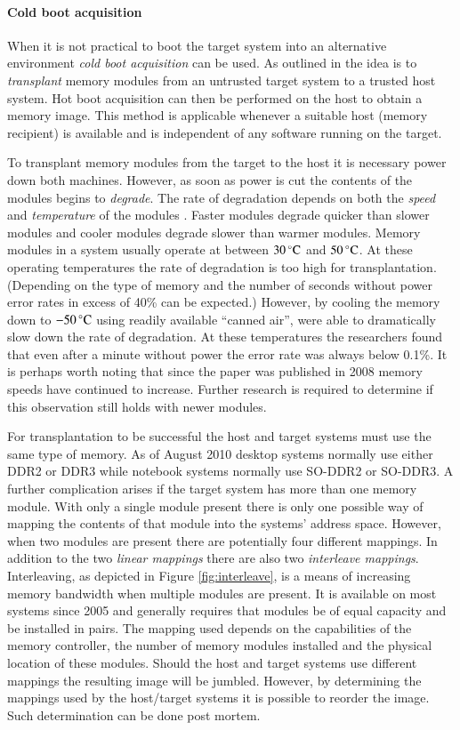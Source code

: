 \documentclass[numbers=noenddot,      %
               abstract,              %
               captions=tableheading, %
               DIV=8]                 %
              {scrartcl}
\begin{document}
\paragraph{Cold boot acquisition}
When it is not practical to boot the target system into an alternative
environment \emph{cold boot acquisition} can be used. As outlined in
\cite{halderman08} the idea is to \emph{transplant} memory modules from
an untrusted target system to a trusted host system. Hot boot
acquisition can then be performed on the host to obtain a memory
image. This method is applicable whenever a suitable host (memory
recipient) is available and is independent of any software running on
the target.

To transplant memory modules from the target to the host it is necessary
power down both machines. However, as soon as power is cut the contents
of the modules begins to \emph{degrade}. The rate of degradation depends
on both the \emph{speed} and \emph{temperature} of the modules
\citep[][table 2]{halderman08}. Faster modules degrade quicker than
slower modules and cooler modules degrade slower than warmer
modules. Memory modules in a system usually operate at between
$\unit[30]{^\circ C}$ and $\unit[50]{^\circ C}$. At these operating
temperatures the rate of degradation is too high for
transplantation. (Depending on the type of memory and the number of
seconds without power error rates in excess of 40\% can be expected.)
However, by cooling the memory down to $\unit[-50]{^\circ C}$ using
readily available ``canned air'', \citeauthor{halderman08} were able to
dramatically slow down the rate of degradation. At these temperatures
the researchers found that even after a minute without power the error
rate was always below 0.1\%. It is perhaps worth noting that since the
paper was published in 2008 memory speeds have continued to
increase. Further research is required to determine if this observation
still holds with newer modules.

For transplantation to be successful the host and target systems must
use the same type of memory. As of August 2010 desktop systems normally
use either DDR2 or DDR3 while notebook systems normally use SO-DDR2 or
SO-DDR3. A further complication arises if the target system has more
than one memory module. With only a single module present there is only
one possible way of mapping the contents of that module into the
systems' address space. However, when two modules are present there are
potentially four different mappings. In addition to the two \emph{linear
  mappings} there are also two \emph{interleave mappings}. Interleaving,
as depicted in Figure \ref{fig:interleave}, is a means of increasing
memory bandwidth when multiple modules are present. It is available on
most systems since 2005 and generally requires that modules be of equal
capacity and be installed in pairs. The mapping used depends on the
capabilities of the memory controller, the number of memory modules
installed and the physical location of these modules. Should the host
and target systems use different mappings the resulting image will be
jumbled. However, by determining the mappings used by the host/target
systems it is possible to reorder the image. Such determination can be
done post mortem.
\end{document}
